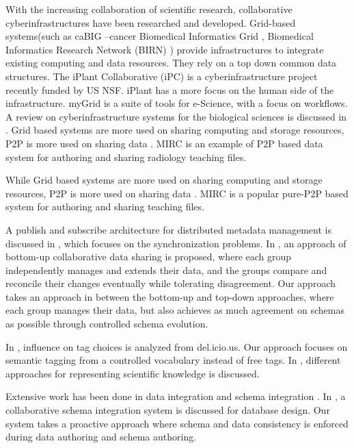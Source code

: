 \documentclass{doublecol-new}
\theoremstyle{TH}{
\newtheorem{lemma}{Lemma}
\newtheorem{theorem}[lemma]{Theorem}
\newtheorem{corrolary}[lemma]{Corrolary}
\newtheorem{conjecture}[lemma]{Conjecture}
\newtheorem{proposition}[lemma]{Proposition}
\newtheorem{claim}[lemma]{Claim}
\newtheorem{stheorem}[lemma]{Wrong Theorem}
\newtheorem{algorithm}{Algorithm}
}
\theoremstyle{THrm}{
\newtheorem{definition}{Definition}[section]
\newtheorem{question}{Question}[section]
\newtheorem{remark}{Remark}
\newtheorem{scheme}{Scheme}
}
\theoremstyle{THhit}{
\newtheorem{case}{Case}[section]
}
\begin{document}
With the increasing collaboration of scientific research,
collaborative cyberinfrastructures have been researched and
developed.  Grid-based systems(such as caBIG{\small \textregistered}
--cancer Biomedical Informatics Grid \cite{cabig}, Biomedical
Informatics Research Network (BIRN) \cite{birn}) provide
infrastructures to integrate existing computing and data resources.
They rely on a top down common data structures. The iPlant
Collaborative (iPC) \cite{pscic}  is a cyberinfrastructure project
recently funded by US NSF. iPlant has a more focus on the human side
of the infrastructure. myGrid \cite{mygrid} is a suite of tools for
e-Science, with a focus on workflows.   A review on
cyberinfrastructure systems for the biological sciences  is
discussed in \cite{stein08}.  Grid based systems are more used on
sharing computing and storage resources, P2P is more used on sharing
data \cite{foster03p2p2grid}.  MIRC \cite{mirc} is an example of P2P
based data system for authoring and sharing radiology  teaching
files.

While Grid based systems are more used on sharing computing and storage
resources, P2P is more used on sharing data \cite{foster03p2p2grid}.  MIRC
\cite{mirc} is a popular pure-P2P based system for authoring and sharing
teaching files.

A publish and subscribe architecture for distributed metadata management is
discussed in \cite{keidl02metadata}, which focuses on the synchronization
problems. In \cite{taylor06reconcile}, an approach of bottom-up collaborative
data sharing is proposed, where each group independently manages and extends
their data, and  the groups compare and reconcile their changes eventually
while tolerating disagreement. Our approach takes an approach in between the
bottom-up and top-down approaches, where each group manages their data, but
also achieves as much agreement on schemas as possible through controlled
schema evolution.


In \cite{rader08tag}, influence on tag choices is analyzed from
del.icio.us. Our approach focuses on semantic tagging from a
controlled vocabulary instead of free tags.  In \cite{pike07},
different approaches for representing scientific knowledge is
discussed.


Extensive work has been done in data integration and schema
integration \cite{halevy06integration,doan05semantic}. In
\cite{beynon97}, a collaborative schema integration system is
discussed for database design. Our system takes a proactive approach
where schema and data consistency is enforced during data authoring
and schema authoring.
\end{document}
